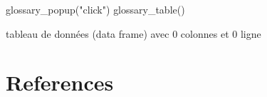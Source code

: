 \documentclass[
  letterpaper,
  DIV=11,
  numbers=noendperiod]{scrreprt}
\newenvironment{Shaded}{\begin{snugshade}}{\end{snugshade}}
\newcommand{\FunctionTok}[1]{\textcolor[rgb]{0.28,0.35,0.67}{#1}}
\newcommand{\NormalTok}[1]{\textcolor[rgb]{0.00,0.23,0.31}{#1}}
\newcommand{\StringTok}[1]{\textcolor[rgb]{0.13,0.47,0.30}{#1}}
\begin{document}
\begin{Shaded}
\begin{Highlighting}[]
\FunctionTok{glossary\_popup}\NormalTok{(}\StringTok{"click"}\NormalTok{)}
\FunctionTok{glossary\_table}\NormalTok{()}
\end{Highlighting}
\end{Shaded}

tableau de données (data frame) avec 0 colonnes et 0 ligne


\chapter*{References}\label{references}

\end{document}
